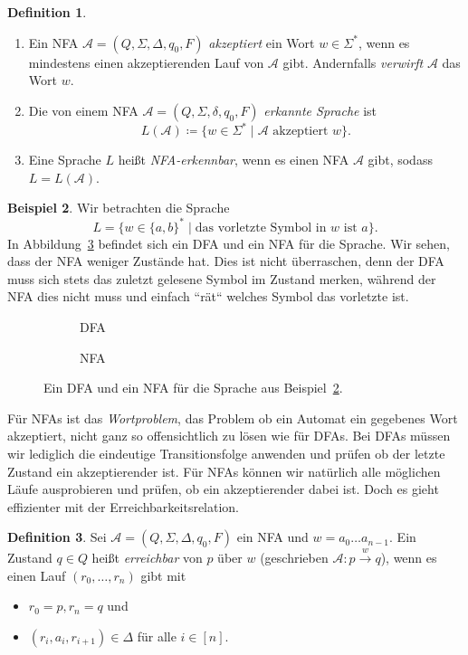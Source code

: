 \documentclass[11pt, a4paper]{article}
\theoremstyle{definition}
\newtheorem{definition}{Definition}[section]
\newtheorem{example}[definition]{Beispiel}
\theoremstyle{plain}
\numberwithin{equation}{section}
\newcommand{\reaches}[1]{\overset{#1}{\rightarrow}}
\begin{document}
\begin{definition}
\
	\begin{enumerate}
		\item Ein NFA $\mathcal{A} = (Q, \Sigma, \Delta, q_0, F)$ \textit{akzeptiert} ein Wort $w \in \Sigma^\ast$, wenn es mindestens einen akzeptierenden Lauf von $\mathcal{A}$ gibt. Andernfalls \textit{verwirft} $\mathcal{A}$ das Wort $w$.
		\item Die von einem NFA $\mathcal{A} = (Q, \Sigma, \delta, q_0, F)$ \textit{erkannte Sprache} ist
			$$
				L(\mathcal{A}) \coloneqq \{ w \in \Sigma^\ast \mid \mathcal{A} \text{ akzeptiert } w \}.
			$$
		\item Eine Sprache $L$ heißt \textit{NFA-erkennbar}, wenn es einen NFA $\mathcal{A}$ gibt, sodass $L = L(\mathcal{A})$.
	\end{enumerate}
\end{definition}
\begin{example}\label{exp:ex2}
	Wir betrachten die Sprache
	$$
		L = \{ w \in \{a, b\}^\ast \mid \text{das vorletzte Symbol in } w \text{ ist } a \}.
	$$
	In Abbildung~\ref{fig:nfa_ex1} befindet sich ein DFA und ein NFA für die Sprache. Wir sehen, dass der NFA weniger Zustände hat. Dies ist nicht überraschen, denn der DFA muss sich stets das zuletzt gelesene Symbol im Zustand merken, während der NFA dies nicht muss und einfach ``rät`` welches Symbol das vorletzte ist.
\end{example}
\begin{figure}
	\centering
	\begin{subfigure}[b]{.49\textwidth}
		\centering
		
		\caption{DFA}
		\label{fig:nfa_ex1dfa}
	\end{subfigure}
	\begin{subfigure}[b]{.49\textwidth}
		\centering
		
		\caption{NFA}
		\label{fig:nfa_ex1nfa}
	\end{subfigure}
	\caption{Ein DFA und ein NFA für die Sprache aus Beispiel~\ref{exp:ex2}.}
	\label{fig:nfa_ex1}
\end{figure}
Für NFAs ist das \textit{Wortproblem}, das Problem ob ein Automat ein gegebenes Wort akzeptiert, nicht ganz so offensichtlich zu lösen wie für DFAs. Bei DFAs müssen wir lediglich die eindeutige Transitionsfolge anwenden und prüfen ob der letzte Zustand ein akzeptierender ist. Für NFAs können wir natürlich alle möglichen Läufe ausprobieren und prüfen, ob ein akzeptierender dabei ist. Doch es gieht effizienter mit der Erreichbarkeitsrelation.
\begin{definition}\label{def:reachability}
	Sei $\mathcal{A} = (Q, \Sigma, \Delta, q_0, F)$ ein NFA und $w = a_0 \ldots a_{n-1}$. Ein Zustand $q \in Q$ heißt \textit{erreichbar} von $p$ über $w$ (geschrieben $\mathcal{A}: p \reaches{w} q$), wenn es einen Lauf $(r_0, \ldots, r_n)$ gibt mit 
	\begin{itemize}
		\item $r_0 = p, r_n = q$ und
		\item $(r_i, a_i, r_{i+1}) \in \Delta$ für alle $i \in [n]$.
	\end{itemize}
\end{definition}
\end{document}

